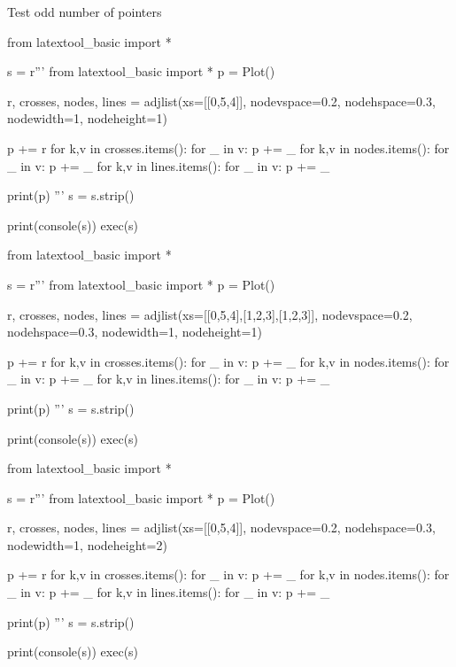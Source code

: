 Test odd number of pointers

\begin{python}
from latextool_basic import *

s = r'''
from latextool_basic import *
p = Plot()

r, crosses, nodes, lines = adjlist(xs=[[0,5,4]],
                                   nodevspace=0.2, nodehspace=0.3,
                                   nodewidth=1, nodeheight=1)

p += r
for k,v in crosses.items():
    for _ in v: p += _
for k,v in nodes.items():
    for _ in v: p += _
for k,v in lines.items():
    for _ in v: p += _

print(p)
'''
s = s.strip()

print(console(s))
exec(s)
\end{python}

\begin{python}
from latextool_basic import *

s = r'''
from latextool_basic import *
p = Plot()

r, crosses, nodes, lines = adjlist(xs=[[0,5,4],[1,2,3],[1,2,3]],
                                   nodevspace=0.2, nodehspace=0.3,
                                   nodewidth=1, nodeheight=1)

p += r
for k,v in crosses.items():
    for _ in v: p += _
for k,v in nodes.items():
    for _ in v: p += _
for k,v in lines.items():
    for _ in v: p += _

print(p)
'''
s = s.strip()

print(console(s))
exec(s)
\end{python}


\begin{python}
from latextool_basic import *

s = r'''
from latextool_basic import *
p = Plot()

r, crosses, nodes, lines = adjlist(xs=[[0,5,4]],
                                   nodevspace=0.2, nodehspace=0.3,
                                   nodewidth=1, nodeheight=2)

p += r
for k,v in crosses.items():
    for _ in v: p += _
for k,v in nodes.items():
    for _ in v: p += _
for k,v in lines.items():
    for _ in v: p += _

print(p)
'''
s = s.strip()

print(console(s))
exec(s)
\end{python}


